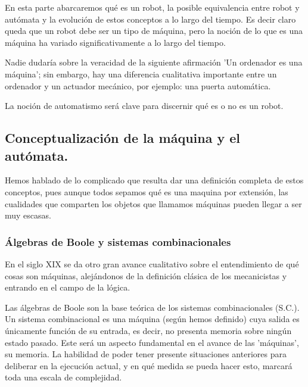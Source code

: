 


En esta parte abarcaremos qué es un robot, la posible equivalencia entre robot y autómata y la evolución de estos conceptos a lo largo del tiempo. Es decir claro queda que un robot debe ser un tipo de máquina, pero la noción de lo que es una máquina ha variado significativamente a lo largo del tiempo. 

\vspace{10px}

Nadie dudaría sobre la veracidad de la siguiente afirmación 'Un ordenador es una máquina'; sin embargo, hay una diferencia cualitativa importante entre un ordenador y un actuador mecánico, por ejemplo: una puerta automática.

\vspace{10px}

La noción de automatismo será clave para discernir qué es o no es un robot. 

\vspace{10px}





\subsection{Conceptualización de la máquina y el autómata.}

Hemos hablado de lo complicado que resulta dar una definición completa de estos conceptos, pues aunque todos sepamos qué es una maquina por extensión, las cualidades que comparten los objetos que llamamos máquinas pueden llegar a ser muy escasas.

\subsubsection{Álgebras de Boole y sistemas combinacionales}

En el siglo XIX se da otro gran avance cualitativo sobre el entendimiento de qué cosas son máquinas, alejándonos de la definición clásica de los mecanicistas y entrando en el campo de la lógica.

\vspace{10px}

Las álgebras de Boole son la base teórica de los sistemas combinacionales (S.C.). Un sistema combinacional es una máquina (según hemos definido) cuya salida es únicamente función de su entrada, es decir, no presenta memoria sobre ningún estado pasado. Este será un aspecto fundamental en el avance de las 'máquinas', su memoria. La habilidad de poder tener presente situaciones anteriores para deliberar en la ejecución actual, y en qué medida se pueda hacer esto, marcará toda una escala de complejidad.

